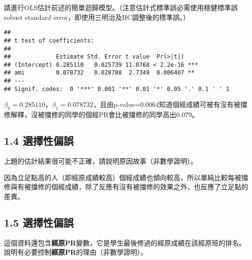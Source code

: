 \documentclass[]{article}
\newenvironment{Shaded}{\begin{snugshade}}{\end{snugshade}}
\newcommand{\KeywordTok}[1]{\textcolor[rgb]{0.13,0.29,0.53}{\textbf{#1}}}
\newcommand{\DataTypeTok}[1]{\textcolor[rgb]{0.13,0.29,0.53}{#1}}
\newcommand{\DecValTok}[1]{\textcolor[rgb]{0.00,0.00,0.81}{#1}}
\newcommand{\StringTok}[1]{\textcolor[rgb]{0.31,0.60,0.02}{#1}}
\newcommand{\OperatorTok}[1]{\textcolor[rgb]{0.81,0.36,0.00}{\textbf{#1}}}
\newcommand{\NormalTok}[1]{#1}
\begin{document}
請進行OLS估計前述的簡單迴歸模型。（注意估計式標準誤必需使用穩健標準誤robust
standard error，即使用三明治及HC調整後的標準誤。）

\begin{Shaded}
\end{Shaded}

\begin{verbatim}
## 
## t test of coefficients:
## 
##             Estimate Std. Error t value  Pr(>|t|)    
## (Intercept) 0.285110   0.025739 11.0768 < 2.2e-16 ***
## ami         0.078732   0.028788  2.7349  0.006407 ** 
## ---
## Signif. codes:  0 '***' 0.001 '**' 0.01 '*' 0.05 '.' 0.1 ' ' 1
\end{verbatim}

\(\beta_{0}=0.285110\)，\(\beta_{1}=0.078732\)，且由p-value=0.0064知道個經成績可被有沒有被擋修解釋，沒被擋修的同學的個經PR會比被擋修的同學高出0.079。

\subsection{1.4 選擇性偏誤}

上題的估計結果很可能不正確，請說明原因故事（非數學證明）。

因為立足點高的人（即經原成績較高）個經成績也傾向較高，所以單純比較每被擋修與有被擋修的個經成績，除了反應有沒有被擋修的效果之外，也反應了立足點的差異。

\subsection{1.5 選擇性偏誤}\label{-1}

這個資料還包含\textbf{經原PR}變數，它是學生最後修過的經原成績在該經原班的排名。說明有必要控制\textbf{經原PR}的理由（非數學證明）。
\end{document}

